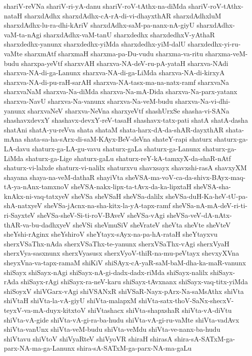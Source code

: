 {shariV-reVNa
shariV-ri-yA-danu
shariV-roV-tAthx-na-diMda
shariV-roV-tAthx-nataH
sharxdAdhx
sharxdAdhx-cA-rA-di-vi-dhayxthAR
sharxdAdhxluM
sharxdAdhx-lu-ra-dhi-kAriV
sharxdAdhx-saM-pa-nanx-nA-giyU
sharxdAdhx-vaM-ta-nAgi
sharxdAdhx-vaM-tanU
sharxdedhx
sharxdedhxV-yAthaR
sharxdedhx-yanunx
sharxdedhx-yiMda
sharxdedhx-yiM-dalU
sharxdedhx-yi-ru-vaMte
sharxmAtf
sharxmaH
sharxma-pa-Du-vudu
sharxma-va-ritu
sharxma-veM-budu
sharxpa-yeVtf
sharxvAH
sharxva-NA-deV-ru-pA-yataH
sharxva-NAdi
sharxva-NA-di-ga-Lanunx
sharxva-NA-di-ga-LiMda
sharxva-NA-di-kirxyA
sharxva-NA-di-pu-raH-sarAH
sharxva-NA-tasx-ma-na-natx-ramf
sharxvaNa
sharxvaNaM
sharxva-Na-diMda
sharxva-Na-mA-Dida
sharxva-Na-parx-yatanx
sharxva-NavU
sharxva-Na-vanunx
sharxva-Na-veM-budu
sharxva-Na-vi-dhi-yanunx
sharxvaNeV
sharxva-NeVna
sharxyeVtf
shashUrxSe
shasha-vi-SANa
shashavxdevxY
shashavx-devxY-reV-tasaH
shashavx-tatx-pati
shatA
shatA-dasha
shatAni
shatA-yu-reVva
shata
shataM
shata-harx-dA-da-shAR-dayxthAR
shata-mAna
shata-sa-ha-sArx-di-saM-KAyx-BeV-deVna
shateY-rapi
shaturx
shaturx-ga-LA-davu
shaturx-ga-LA-gu-vavu
shaturx-gaLa
shaturx-ga-Lanunx
shaturx-ga-LiMda
shaturx-ga-Lige
shaturx-gaLu
shaturx-reY-kA-tamxyX-da-shaR-nAtf
shaturx-vi-lalxde
shaturx-vi-nalilx
shaturxvu
shavxsayx
shavxshi-rasA
shavxyXM
shayana
shaya-na-veM-dathaR
shayiVta
sheVSA-ma-voV-ca-da-shivx-BAyx-maq-tA-ya-nAnx-tamxnoV
sheVSA-nakx-lipx-ta-tAvx-da-ka-lipxtaH
sheVSA-sha-knAkx-ni-vaq-tatxyeV
sheVSa
sheVSaH
sheVSa-dalilx
sheVSa-duH-Ka-heV-tU-pa-shA-natxyeV
sheVSa-jAcnx-na-sha-kitx-la-yA-tapx-ramf
sheVSa-nA-mA-deV-ri-ti-ri-SayxteV
sheVSa-sheV-Si-ti-roV-BAveV
sheVSa-vAgi
sheVSa-veV-dA-nAtx-thAR-va-bu-dadhxyeV
sheVSi
sheVmuSiV
sheVrateV
sheVta
sheVte
sheVteV
sheYshi-rAginx
sheYshiroV
sheYtayx-sAyx-na-pa-hA-rataH
sheYtayxvu
sherxVSaThx-nAda
sherxVSaThx-te-yanunx
sherxVSaThx-vAgi
sherxVyaH
sherxVya-sasxnunx
sherxVyasusx
sherxVyoV-thiR-na-mu-peVtayx
shevxyXVna
sheyxVna-va-tapx-ramaM
shiKiV
shiSAyx-cA-yaR-saM-baM-dha-ka-maR-vanunx
shiSayx
shiSayx-nAgi
shiSayx-nA-gi-dadx-dadx-riMda
shiSayx-nalilx
shiSayx-rAda
shiSayx-rAgi
shiSayx-ra-neV-karu
shiSayx-tAvxnanx
shiSayx-vaq-titx-yiMda
shiSoyxV
shiVGarx-vAgi
shiVSANxR
shiVSaR-Nayx-pArx-Na-saMsAthx
shiVta
shiVtaH
shiVta-la-vA-giyU
shiVta-malapxM
shiVta-satx-thoV-SaNx-shecxV-teyxV-va-mA-duyx-kitxtoV
shiVtashacx
shiVta-shapxshaR
shiVta-vA-diVtu
shiVta-vA-gide
shiVta-vA-gi-ra-ba-hudu
shiVta-vA-gi-ru-vaMte
shiVta-vadAvx
shiVta-vanUnx
shiVta-veM-budu
shiVta-veMdu
shiVta-ve-nanx-ba-hudu
shiVtavu
shiVtoV
shiVyaRteV
shiVyoVR
shiraH
shirasA
shira-sA-SATxM-ga-parx-NA-ma-ga-Lanunx
shira-sA-SATxM-ga-parx-NA-ma-gaLu
}
